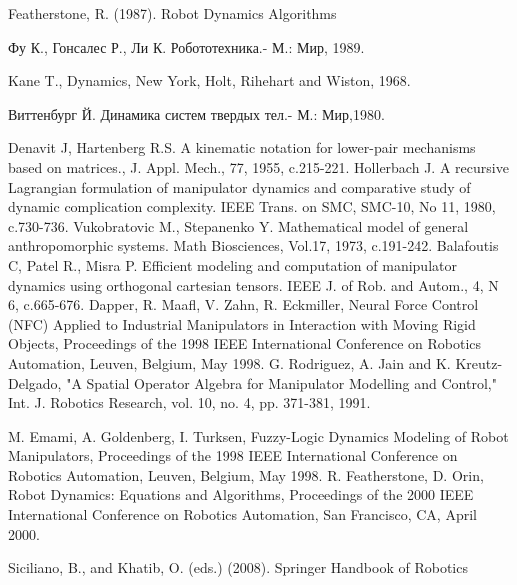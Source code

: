 
\label{section_bibliography}

\begin{thebibliography}{99} %

Featherstone, R. (1987). Robot Dynamics Algorithms

Фу К., Гонсалес Р., Ли К. Робототехника.- М.: Мир, 1989.

Kane T., Dynamics, New York, Holt,  Rihehart  and  Wiston, 1968.

Виттенбург Й. Динамика систем твердых тел.- М.: Мир,1980.

Denavit J, Hartenberg R.S. A kinematic notation for lower­-pair mechanisms based on matrices.,  J. Appl. Mech., 77, 1955, c.215-221.
Hollerbach J. A recursive Lagrangian formulation of manipu­lator dynamics and comparative study of dynamic complication complexity. IEEE Trans. on SMC, SMC-10, No 11, 1980, c.730-736.
Vukobratovic M., Stepanenko Y. Mathematical model of gene­ral anthropomorphic systems. Math Biosciences, Vol.17, 1973, c.191-242.
Balafoutis C, Patel R., Misra P. Efficient modeling and computation of manipulator dynamics using orthogonal cartesian tensors. IEEE J. of Rob. and Autom., 4, N 6, c.665-676.
Dapper, R. Maafl, V. Zahn, R. Eckmiller, Neural Force Control (NFC) Applied to Industrial Manipulators in Interaction with Moving Rigid Objects, Proceedings of the 1998 IEEE International Conference on Robotics  Automation, Leuven, Belgium,  May 1998.
G. Rodriguez, A. Jain and K. Kreutz-Delgado, "A Spatial Operator Algebra for Manipulator Modelling and Control," Int. J. Robotics Research, vol. 10, no. 4, pp. 371-381, 1991.

M. Emami, A. Goldenberg, I. Turksen, Fuzzy-Logic Dynamics Modeling of Robot Manipulators, Proceedings of the 1998 IEEE International Conference on Robotics  Automation, Leuven, Belgium,  May 1998.
R. Featherstone, D. Orin, Robot Dynamics: Equations and Algorithms, Proceedings of the 2000 IEEE International Conference on Robotics  Automation, San Francisco, CA, April 2000.

Siciliano, B., and Khatib, O. (eds.) (2008). Springer Handbook of Robotics


\end{thebibliography}
